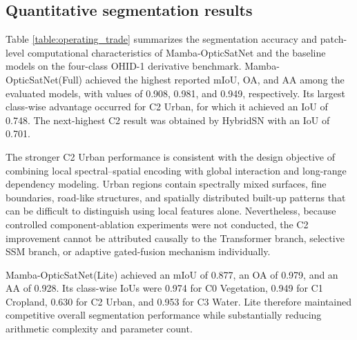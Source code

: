 \documentclass[a4paper,fleqn]{cas-dc}
\begin{document}
\subsection{Quantitative segmentation results}
Table \ref{table:operating_trade} summarizes the segmentation accuracy and patch-level computational characteristics of Mamba-OpticSatNet and the baseline models on the four-class OHID-1 derivative benchmark.
Mamba-OpticSatNet(Full) achieved the highest reported mIoU, OA, and AA among the evaluated models, with values of 0.908, 0.981, and 0.949, respectively. Its largest class-wise advantage occurred for C2 Urban, for which it achieved an IoU of 0.748. The next-highest C2 result was obtained by HybridSN with an IoU of 0.701.

The stronger C2 Urban performance is consistent with the design objective of combining local spectral–spatial encoding with global interaction and long-range dependency modeling. Urban regions contain spectrally mixed surfaces, fine boundaries, road-like structures, and spatially distributed built-up patterns that can be difficult to distinguish using local features alone. Nevertheless, because controlled component-ablation experiments were not conducted, the C2 improvement cannot be attributed causally to the Transformer branch, selective SSM branch, or adaptive gated-fusion mechanism individually.

Mamba-OpticSatNet(Lite) achieved an mIoU of 0.877, an OA of 0.979, and an AA of 0.928. Its class-wise IoUs were 0.974 for C0 Vegetation, 0.949 for C1 Cropland, 0.630 for C2 Urban, and 0.953 for C3 Water. Lite therefore maintained competitive overall segmentation performance while substantially reducing arithmetic complexity and parameter count.
\end{document}
